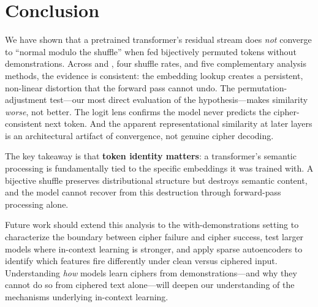 \section{Conclusion}
\label{sec:conclusion}

We have shown that a pretrained transformer's residual stream does \emph{not} converge to ``normal modulo the shuffle'' when fed bijectively permuted tokens without demonstrations. Across \gpttwo and \pythia, four shuffle rates, and five complementary analysis methods, the evidence is consistent: the embedding lookup creates a persistent, non-linear distortion that the forward pass cannot undo. The permutation-adjustment test---our most direct evaluation of the hypothesis---makes similarity \emph{worse}, not better. The logit lens confirms the model never predicts the cipher-consistent next token. And the apparent representational similarity at later layers is an architectural artifact of \layernorm convergence, not genuine cipher decoding.

The key takeaway is that \textbf{token identity matters}: a transformer's semantic processing is fundamentally tied to the specific embeddings it was trained with. A bijective shuffle preserves distributional structure but destroys semantic content, and the model cannot recover from this destruction through forward-pass processing alone.

Future work should extend this analysis to the with-demonstrations setting to characterize the boundary between cipher failure and cipher success, test larger models where in-context learning is stronger, and apply sparse autoencoders to identify which features fire differently under clean versus ciphered input. Understanding \emph{how} models learn ciphers from demonstrations---and why they cannot do so from ciphered text alone---will deepen our understanding of the mechanisms underlying in-context learning.

